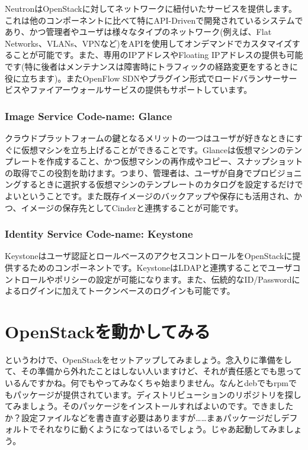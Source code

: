 \documentclass[9pt,b5paper,tombo,openany]{jsbook}
\begin{document}
NeutronはOpenStackに対してネットワークに紐付いたサービスを提供します。これは他のコンポーネントに比べて特にAPI-Drivenで開発されているシステムであり、かつ管理者やユーザは様々なタイプのネットワーク(例えば、Flat Networks、VLANs、VPNなど)をAPIを使用してオンデマンドでカスタマイズすることが可能です。また、専用のIPアドレスやFloating IPアドレスの提供も可能です(特に後者はメンテナンスは障害時にトラフィックの経路変更をするときに役に立ちます)。またOpenFlow SDNやプラグイン形式でロードバランサーサービスやファイアーウォールサービスの提供もサポートしています。

\subsection{Image Service Code-name: Glance}

クラウドプラットフォームの鍵となるメリットの一つはユーザが好きなときにすぐに仮想マシンを立ち上げることができることです。Glanceは仮想マシンのテンプレートを作成すること、かつ仮想マシンの再作成やコピー、スナップショットの取得でこの役割を助けます。つまり、管理者は、ユーザが自身でプロビジョニングするときに選択する仮想マシンのテンプレートのカタログを設定するだけでよいということです。また既存イメージのバックアップや保存にも活用され、かつ、イメージの保存先としてCinderと連携することが可能です。

\subsection{Identity Service Code-name: Keystone}

Keystoneはユーザ認証とロールベースのアクセスコントロールをOpenStackに提供するためのコンポーネントです。KeystoneはLDAPと連携することでユーザコントロールやポリシーの設定が可能になります。また、伝統的なID/Passwordによるログインに加えてトークンベースのログインも可能です。

\chapter{OpenStackを動かしてみる}

\begin{figure}
\minitoc
\end{figure}

というわけで、OpenStackをセットアップしてみましょう。念入りに準備をして、その準備から外れたことはしない人いますけど、それが責任感とでも思っているんですかね。何でもやってみなくちゃ始まりません。なんとdebでもrpmでもパッケージが提供されています。ディストリビューションのリポジトリを探してみましょう。そのパッケージをインストールすればよいのです。できましたか？設定ファイルなどを書き直す必要はありますが……まぁパッケージだしデフォルトでそれなりに動くようになってはいるでしょう。じゃあ起動してみましょう。
\end{document}
